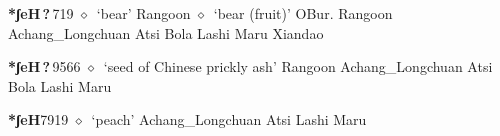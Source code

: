   \begin{list}{}{\leftmargin=1.5em \itemindent=-1.5em}
  \item {\footnotesize \textbf{*ʃeH\,?\,}}{\tiny 719}
         $\diamond$~`bear'
         Rangoon 
\hspace{1ex}
         $\diamond$~`bear (fruit)'
         OBur. 
\hspace{1ex}
         Rangoon 
\hspace{1ex}
         Achang\_Longchuan 
\hspace{1ex}
         Atsi 
\hspace{1ex}
         Bola 
\hspace{1ex}
         Lashi 
\hspace{1ex}
         Maru 
\hspace{1ex}
         Xiandao 
  \item {\footnotesize \textbf{*ʃeH\,?\,}}{\tiny 9566}
\hspace{1ex}
         $\diamond$~`seed of Chinese prickly ash'
         Rangoon 
\hspace{1ex}
         Achang\_Longchuan 
\hspace{1ex}
         Atsi 
\hspace{1ex}
         Bola 
\hspace{1ex}
         Lashi 
\hspace{1ex}
         Maru 
  \item {\footnotesize \textbf{*ʃeH}}{\tiny 7919}
\hspace{1ex}
         $\diamond$~`peach'
         Achang\_Longchuan 
\hspace{1ex}
         Atsi 
\hspace{1ex}
         Lashi 
\hspace{1ex}
         Maru 
\hspace{1ex}

\end{list}
